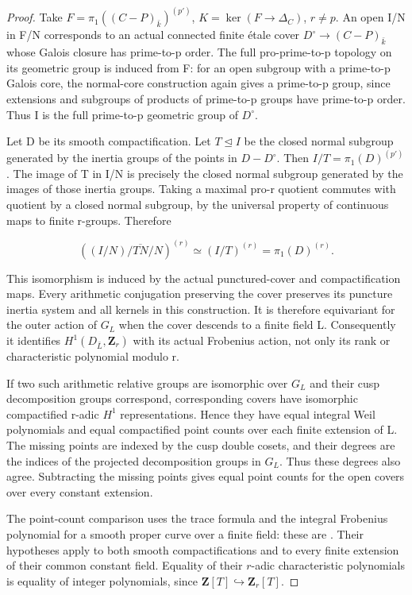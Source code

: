 \begin{proof}

Take \(F=\pi_1((C-P)_{\bar k})^{(p')}\), \(K=\ker(F\to\Delta_C)\), \(r{\ne}p\). An open I/N in F/N corresponds to an actual connected finite étale cover \(D^\circ\to(C-P)_{\bar k}\) whose Galois closure has prime-to-p order. The full pro-prime-to-p topology on its geometric group is induced from F: for an open subgroup with a prime-to-p Galois core, the normal-core construction again gives a prime-to-p group, since extensions and subgroups of products of prime-to-p groups have prime-to-p order. Thus I is the full prime-to-p geometric group of \(D^{\circ}\).

Let D be its smooth compactification. Let \(T{\trianglelefteq}I\) be the closed normal subgroup generated by the inertia groups of the points in \(D-D^{\circ}\). Then \(I/T=\pi_1(D)^{(p')}\). The image of T in I/N is precisely the closed normal subgroup generated by the images of those inertia groups. Taking a maximal pro-r quotient commutes with quotient by a closed normal subgroup, by the universal property of continuous maps to finite r-groups. Therefore

\[
 ((I/N)/\overline{TN}/N)^{(r)}
 \simeq (I/T)^{(r)}
 =\pi_1(D)^{(r)}.
\]

This isomorphism is induced by the actual punctured-cover and compactification maps. Every arithmetic conjugation preserving the cover preserves its puncture inertia system and all kernels in this construction. It is therefore equivariant for the outer action of \(G_L\) when the cover descends to a finite field L. Consequently it identifies \(H^1(D_{\bar L},\mathbf Z_r)\) with its actual Frobenius action, not only its rank or characteristic polynomial modulo r.

If two such arithmetic relative groups are isomorphic over \(G_L\) and their cusp decomposition groups correspond, corresponding covers have isomorphic compactified r-adic \(H^1\) representations. Hence they have equal integral Weil polynomials and equal compactified point counts over each finite extension of L. The missing points are indexed by the cusp double cosets, and their degrees are the indices of the projected decomposition groups in \(G_L\). Thus these degrees also agree. Subtracting the missing points gives equal point counts for the open covers over every constant extension.

The point-count comparison uses the trace formula and the integral
Frobenius polynomial for a smooth proper curve over a finite field:
these are \cite[formula (1.5.1) and Theorem (1.6)]{WeilCurves}.
Their hypotheses apply to both smooth compactifications and to every
finite extension of their common constant field. Equality of their
\(r\)-adic characteristic polynomials is equality of integer polynomials,
since \(\mathbf Z[T]\hookrightarrow\mathbf Z_r[T]\).


\end{proof}

